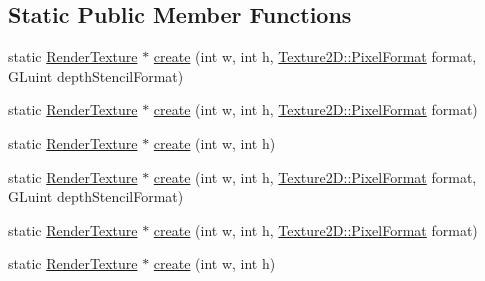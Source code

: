 \subsection*{Static Public Member Functions}
\begin{DoxyCompactItemize}
\item 
static \hyperlink{classRenderTexture}{Render\+Texture} $\ast$ \hyperlink{classRenderTexture_a12dbd5bb59e5f86eb57890b528c899a5}{create} (int w, int h, \hyperlink{classTexture2D_a45d9d8bb5a0669def36bbdfbfb91d220}{Texture2\+D\+::\+Pixel\+Format} format, G\+Luint depth\+Stencil\+Format)
\item 
static \hyperlink{classRenderTexture}{Render\+Texture} $\ast$ \hyperlink{classRenderTexture_abbcc62a18ebbe598b315c58607d6bb84}{create} (int w, int h, \hyperlink{classTexture2D_a45d9d8bb5a0669def36bbdfbfb91d220}{Texture2\+D\+::\+Pixel\+Format} format)
\item 
static \hyperlink{classRenderTexture}{Render\+Texture} $\ast$ \hyperlink{classRenderTexture_a0b242c07861d823072bc3a8efd8725ae}{create} (int w, int h)
\item 
static \hyperlink{classRenderTexture}{Render\+Texture} $\ast$ \hyperlink{classRenderTexture_ac3abc0d238bb993f6aad9c524b6a1b9a}{create} (int w, int h, \hyperlink{classTexture2D_a45d9d8bb5a0669def36bbdfbfb91d220}{Texture2\+D\+::\+Pixel\+Format} format, G\+Luint depth\+Stencil\+Format)
\item 
static \hyperlink{classRenderTexture}{Render\+Texture} $\ast$ \hyperlink{classRenderTexture_add6dc1bbac92245b84d2a5a3e7fc7fc7}{create} (int w, int h, \hyperlink{classTexture2D_a45d9d8bb5a0669def36bbdfbfb91d220}{Texture2\+D\+::\+Pixel\+Format} format)
\item 
static \hyperlink{classRenderTexture}{Render\+Texture} $\ast$ \hyperlink{classRenderTexture_a2962685f93c5e33b2e92b4745cfbf99d}{create} (int w, int h)
\end{DoxyCompactItemize}
